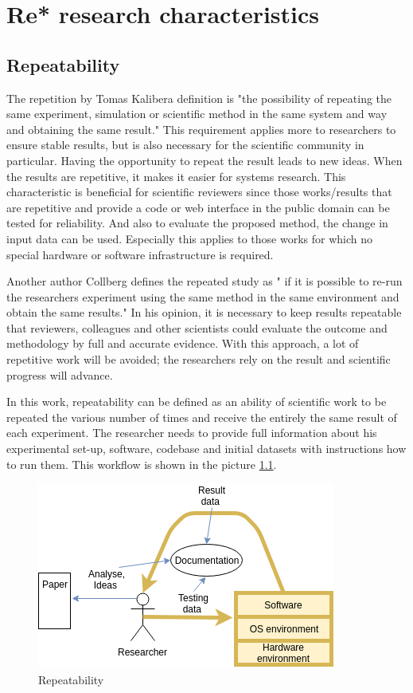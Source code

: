 \chapter{Re* research characteristics}
\section{Repeatability}
The repetition by Tomas Kalibera\cite{DBLP:conf/popl/Vitek15} definition is "the possibility of repeating the same experiment, simulation or scientific method in the same system and way and obtaining the same result." This requirement applies more to researchers to ensure stable results, but is also necessary for the scientific community in particular. Having the opportunity to repeat the result leads to new ideas. When the results are repetitive, it makes it easier for systems research. This characteristic is beneficial for scientific reviewers since those works/results that are repetitive and provide a code or web interface in the public domain can be tested for reliability. And also to evaluate the proposed method, the change in input data can be used. Especially this applies to those works for which no special hardware or software infrastructure is required. \par
Another author Collberg\cite{DBLP:journals/cacm/CollbergP16} defines the repeated study as " if it is possible to re-run the researchers experiment using the same method in the same environment and obtain the same results." In his opinion, it is necessary to keep results repeatable that reviewers, colleagues and other scientists could evaluate the outcome and methodology by full and accurate evidence. With this approach, a lot of repetitive work will be avoided; the researchers rely on the result and scientific progress will advance. \par
In this work, repeatability can be defined as an ability of scientific work to be repeated the various number of times and receive the entirely the same result of each experiment. The researcher needs to provide full information about his experimental set-up, software, codebase and initial datasets with instructions how to run them. This workflow is shown in the picture \ref{fig:repeatability}. \par
\begin{figure}[h!]
  \includegraphics[scale=0.8]{fig/repeatability.png}
  \caption{Repeatability\cite{gith}}
  \label{fig:repeatability}
\end{figure}
